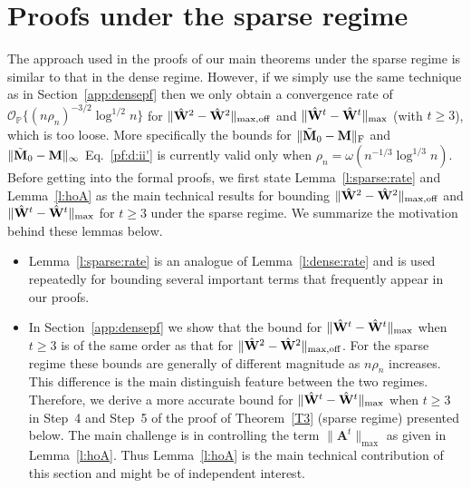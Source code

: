 \documentclass[10pt,journal,compsoc]{IEEEtran}
\newcommand{\op}{\mathcal{O}_{\mathbb{P}}}
\newcommand{\off}{\mathrm{off}}
\newcommand{\M}[1]{{{\mathbf{\MakeUppercase{#1}}}}}
\newcommand{\F}{\mathrm{F}}
\numberwithin{equation}{section}
\begin{document}
\section{Proofs under the sparse regime}\label{app:sparsepf}
The approach used in the proofs of our main theorems under
the sparse regime is similar to that in the dense regime. However, if
we simply use the same technique as in Section~\ref{app:densepf} then
we only obtain a convergence rate of $\op\{(n\rho_n)^{-3/2}\log^{1/2}{n}\}$ for $\|\hat{\M W}^2 - \hat{\M W}^2\|_{\max,\off}$ and
$\|\hat{\M W}^t - \hat{\M W}^t\|_{\max}$ (with $t\geq 3$), which is too loose.  More specifically the bounds for %
$\|\tilde{\M M}_0- \M M\|_\F$ and $\|\tilde{\M M}_0 - \M M\|_{\infty}$ %
Eq.~\eqref{pf:d:ii'} is currently valid only when $\rho_n
 = \omega(n^{-1/3} \log^{1/3}{n})$. %
Before getting into the formal proofs, we first state 
Lemma~\ref{l:sparse:rate} and Lemma~\ref{l:hoA} as the main
technical results for bounding $\|\hat{\M W}^2 - \hat{\M
W}^2\|_{\max,\off}$ and $\|\hat{\M W}^t - \hat{\M W}^t\|_{\max}$ for $t\geq
3$ under the sparse regime. We summarize the motivation behind these lemmas
below. 
\begin{itemize}
\item Lemma~\ref{l:sparse:rate} is an analogue of
  Lemma~\ref{l:dense:rate} and is used
  repeatedly for bounding several important terms that frequently appear in our proofs.
\item In Section~\ref{app:densepf} we show that the bound for $\|\hat{\M W}^t - \hat{\M
W}^t\|_{\max}$ when $t\geq 3$ is of the same order as that for $\|\hat{\M W}^2 - \hat{\M
  W}^2\|_{\max,\off}$. For the sparse regime these bounds are generally of different magnitude as $n\rho_n$ increases. 
  This difference is the main distinguish feature 
between the two regimes.  Therefore, we derive a more accurate bound for $\|\hat{\M W}^t - \hat{\M
W}^t\|_{\max}$ when $t \geq 3$ in Step~4 and Step~5 of the proof of
Theorem~\ref{T3} (sparse regime) presented below. The main challenge is in controlling the term $\|\mathbf{A}^{t}\|_{\mathrm{max}}$ as
given in Lemma~\ref{l:hoA}. Thus Lemma~\ref{l:hoA} is
 the main technical contribution of this section and might be of independent interest. 
\end{itemize}
\end{document}
